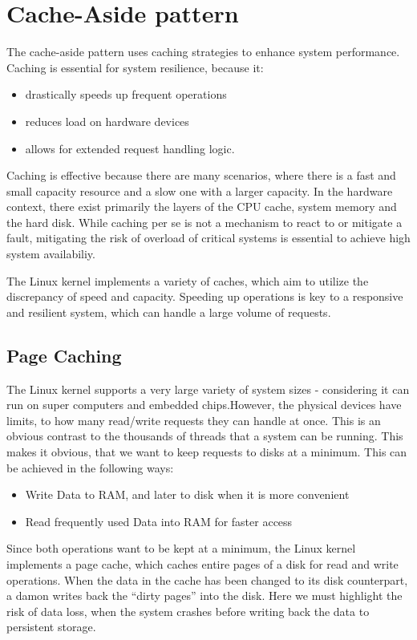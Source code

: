\chapter{Cache-Aside pattern}
The cache-aside pattern uses caching strategies to enhance system performance. \cite{cache_aside}
Caching is essential for system resilience, because it:
\begin{itemize}
\item drastically speeds up frequent operations
\item reduces load on hardware devices
\item allows for extended request handling logic.
\end{itemize}

Caching is effective because there are many scenarios, where there is a fast and small capacity resource and a slow one with a larger capacity. In the hardware context, there exist primarily the layers of the CPU cache, system memory and the hard disk.
While caching per se is not a mechanism to react to or mitigate a fault, mitigating the risk of overload of critical systems is essential to achieve high system availabiliy. 

The Linux kernel implements a variety of caches, which aim to utilize the discrepancy of speed and capacity. Speeding up operations is key to a responsive and resilient system, which can handle a large volume of requests.

\section{Page Caching}
The Linux kernel supports a very large variety of system sizes - considering it can run on super computers and embedded chips.However, the physical devices have limits, to how many read/write requests they can handle at once. This is an obvious contrast to the thousands of threads that a system can be running.
This makes it obvious, that we want to keep requests to disks at a minimum. This can be achieved in the following ways:
\begin{itemize}
        \item Write Data to RAM, and later to disk when it is more convenient
        \item Read frequently used Data into RAM for faster access
\end{itemize}

Since both operations want to be kept at a minimum, the Linux kernel implements a page cache, which caches entire pages of a disk for read and write operations. \cite[ch. 15.1]{bovet2005understanding}
When the data in the cache has been changed to its disk counterpart, a damon writes back the \enquote{dirty pages} into the disk. Here we must highlight the risk of data loss, when the system crashes before writing back the data to persistent storage.

